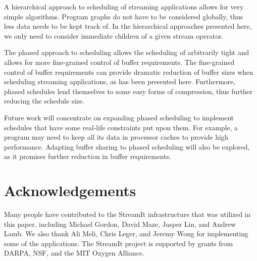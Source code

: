\documentclass{sig-alt-full}
\begin{document}
A hierarchical approach to scheduling of streaming applications allows
for very simple algorithms. Program graphs do not have to be
considered globally, thus less data needs to be kept track of.  In
the hierarchical approaches presented here, we only need to consider
immediate children of a given stream operator.

The phased approach to scheduling allows the scheduling of arbitrarily
tight {\feedbackloops} and allows for more fine-grained control of
buffer requirements. The fine-grained control of buffer requirements
can provide dramatic reduction of buffer sizes when scheduling
streaming applications, as has been presented here. Furthermore,
phased schedules lend themselves to some easy forms of compression,
thus further reducing the schedule size.

Future work will concentrate on expanding phased scheduling to
implement schedules that have some real-life constraints put upon
them. For example, a program may need to keep all its data in
processor caches to provide high performance.  Adapting buffer sharing
to phased scheduling will also be explored, as it promises further
reduction in buffer requirements.

\section{Acknowledgements}

Many people have contributed to the StreamIt infrastructure that was
utilized in this paper, including Michael Gordon, David Maze, Jasper
Lin, and Andrew Lamb.  We also thank Ali Meli, Chris Leger, and Jeremy
Wong for implementing some of the applications.  The StreamIt project
is supported by grants from DARPA, NSF, and the MIT Oxygen Alliance.
\end{document}
